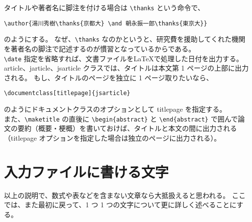 タイトルや著者名に脚注を付ける場合は \verb'\thanks' という命令で、
\begin{mdframed}[roundcorner=0.50zw,leftmargin=3.00zw,rightmargin=3.00zw,skipabove=0.40zw,skipbelow=0.40zw,innertopmargin=4.00pt,innerbottommargin=4.00pt,innerleftmargin=5.00pt,innerrightmargin=5.00pt,linecolor=gray!020,linewidth=0.50pt,backgroundcolor=gray!20]
\begin{verbatim}
\author{湯川秀樹\thanks{京都大} \and 朝永振一郎\thanks{東京大}}
\end{verbatim}
\end{mdframed}
のようにする。
なぜ、\verb'\thanks' なのかというと、研究費を援助してくれた機関を著者名の脚注で記述するのが慣習となっているからである。\\

\verb'\date' 指定を省略すれば、文書ファイルを\LaTeX{}で処理した日付を出力する。
article、jarticle、jsarticle クラスでは、タイトルは本文第 1 ページの上部に出力される。
もし、タイトルのページを独立に 1 ページ取りたいなら、
\begin{mdframed}[roundcorner=0.50zw,leftmargin=3.00zw,rightmargin=3.00zw,skipabove=0.40zw,skipbelow=0.40zw,innertopmargin=4.00pt,innerbottommargin=4.00pt,innerleftmargin=5.00pt,innerrightmargin=5.00pt,linecolor=gray!020,linewidth=0.50pt,backgroundcolor=gray!20]
\begin{verbatim}
\documentclass[titlepage]{jsarticle}
\end{verbatim}
\end{mdframed}
のようにドキュメントクラスのオプションとして titlepage を指定する。\\

また、\verb'\maketitle' の直後に \verb'\begin{abstract}' と \verb'\end{abstract}' で囲んで論文の要約（概要・梗概）を書いておけば、タイトルと本文の間に出力される（titlepage オプションを指定した場合は独立のページに出力される）。
\section{入力ファイルに書ける文字}
以上の説明で、数式や表などを含まない文章なら大抵扱えると思われる。
ここでは、また最初に戻って、1 つ 1 つの文字について更に詳しく述べることにする。\\

